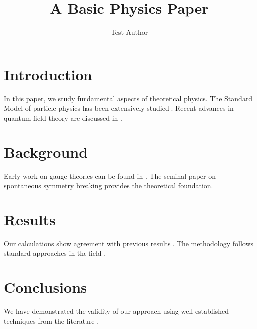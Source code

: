 \documentclass{article}
\title{A Basic Physics Paper}
\author{Test Author}
\date{}
\begin{document}
\maketitle

\section{Introduction}

In this paper, we study fundamental aspects of theoretical physics. The Standard Model of particle physics has been extensively studied \cite{1724847}. Recent advances in quantum field theory are discussed in \cite{2112.00006}.

\section{Background}

Early work on gauge theories can be found in \cite{796859}. The seminal paper on spontaneous symmetry breaking \cite{hep-th/9803103} provides the theoretical foundation.

\section{Results}

Our calculations show agreement with previous results \cite{2301.12345}. The methodology follows standard approaches in the field \cite{1450044}.

\section{Conclusions}

We have demonstrated the validity of our approach using well-established techniques from the literature \cite{2112.00006,1724847}.



\end{document}
